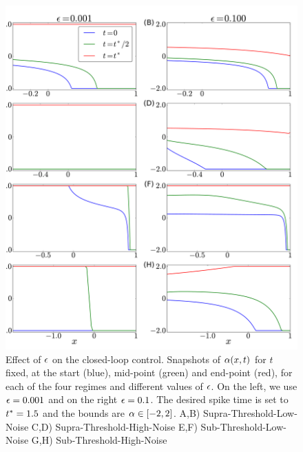 \documentclass[12pt]{iopart}
\begin{document}
\begin{figure}[htp]
\begin{center}
  \includegraphics[width=.99\textwidth]{Figs/HJB/Regimes_eps_comparison.pdf}
  \caption[labelInTOC]{Effect of ${\epsilon}$ on the closed-loop control. Snapshots of
  ${\alpha}(x,t)$ for $t$ fixed, at the start (blue), mid-point (green) and end-point
  (red), for each of the four regimes and different values of ${\epsilon}$.
  On the left, we use ${\epsilon} = 0.001$ and on the right ${\epsilon} = 0.1$.
  The desired spike time is set to
  ${ t^* }=1.5$ and the bounds are ${\alpha} \in [-2,2]$. 
  A,B)
   Supra-Threshold-Low-Noise 
  C,D) 
   Supra-Threshold-High-Noise 
  E,F)
   Sub-Threshold-Low-Noise 
  G,H)
   Sub-Threshold-High-Noise}
\label{fig:HJB_4regimes_control_different_eps} 
\end{center}
\end{figure}
\end{document}
